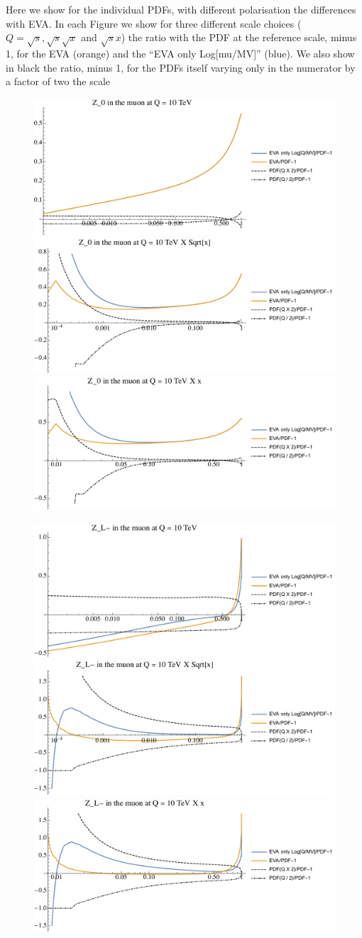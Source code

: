 \documentclass[a4paper,11pt]{article}
\begin{document}
Here we show for the individual PDFs, with different polarisation the differences with EVA. In each Figure we show for three different scale choices ($Q=\sqrt{s}, \sqrt{s} \sqrt{x}$ and $\sqrt{s} x$) the ratio with the PDF at the reference scale, minus 1, for the EVA (orange) and the ``EVA only Log[mu/MV]'' (blue). We also show in black the ratio, minus 1, for the PDFs itself varying only in the numerator by a factor of two the scale



\begin{figure}[!b]
\includegraphics[width=0.46\linewidth]{Notebooks/PlotPDFs/ratios/10TeV/Z_0_Q.pdf}
\includegraphics[width=0.46\linewidth]{Notebooks/PlotPDFs/ratios/10TeV/Z_0_Qsqrtx.pdf}
\includegraphics[width=0.46\linewidth]{Notebooks/PlotPDFs/ratios/10TeV/Z_0_Qx.pdf}
\end{figure}

\begin{figure}[!b]
\includegraphics[width=0.46\linewidth]{Notebooks/PlotPDFs/ratios/10TeV/Z_L-_Q.pdf}
\includegraphics[width=0.46\linewidth]{Notebooks/PlotPDFs/ratios/10TeV/Z_L-_Qsqrtx.pdf}
\includegraphics[width=0.46\linewidth]{Notebooks/PlotPDFs/ratios/10TeV/Z_L-_Qx.pdf}
\end{figure}
\end{document}
